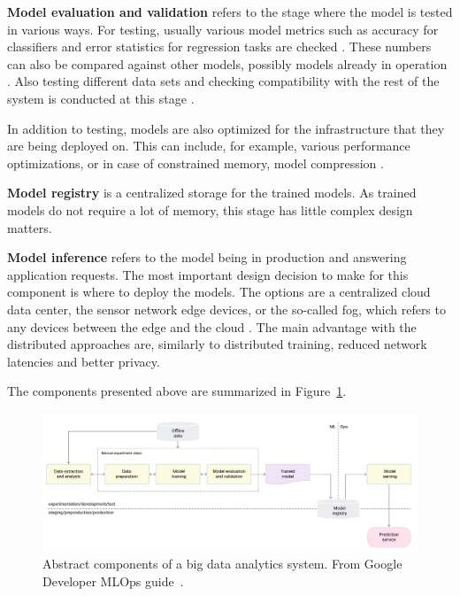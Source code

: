 \textbf{Model evaluation and validation} refers to the stage where the model is tested in various ways. For testing, usually various model metrics such as accuracy for classifiers and error statistics for regression tasks are checked \cite{iotsurvey}. These numbers can also be compared against other models, possibly models already in operation \cite{googlemlops}. Also testing different data sets and checking compatibility with the rest of the system is conducted at this stage \cite{googlemlops}.

In addition to testing, models are also optimized for the infrastructure that they are being deployed on. This can include, for example, various performance optimizations, or in case of constrained memory, model compression \cite{iotsurvey}.

\textbf{Model registry} is a centralized storage for the trained models. As trained models do not require a lot of memory, this stage has little complex design matters.

\textbf{Model inference} refers to the model being in production and answering application requests.
The most important design decision to make for this component is where to deploy the models. The options are a centralized cloud data center, the sensor network edge devices, or the so-called fog, which refers to any devices between the edge and the cloud \cite{fogsurvey}. The main advantage with the distributed approaches are, similarly to distributed training, reduced network latencies and better privacy. \cite{szeEfficientProcessingDeep2017}

The components presented above are summarized in Figure~\ref{simplepipeline}.

\begin{figure}[hb]
\newline
\begin{center}
\includegraphics[width=1.0\columnwidth]{simplegoogle.png}
\caption{Abstract components of a big data analytics system. From Google Developer MLOps guide~\cite{googlemlops}.}
\label{simplepipeline}
\end{center}
\end{figure}

